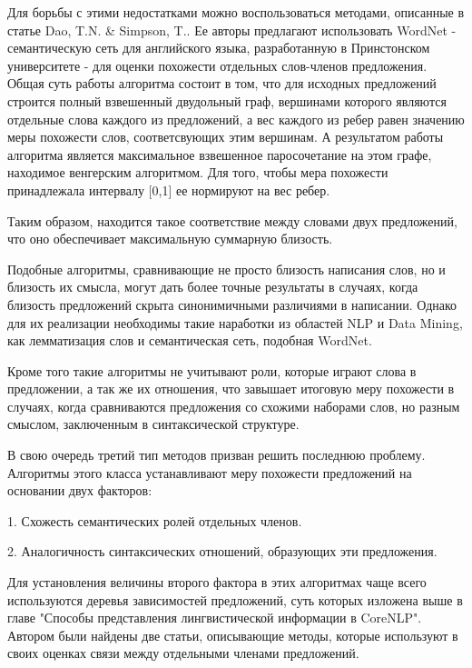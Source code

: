 Для борьбы с этими недостатками можно воспользоваться методами, описанные в статье Dao, T.N. & Simpson, T.\cite{wordnetSim}.
Ее авторы предлагают использовать WordNet\cite{wordnet} - семантическую сеть для английского языка, 
разработанную в Принстонском университете - для оценки похожести отдельных слов-членов предложения.
Общая суть работы алгоритма состоит в том, что для исходных предложений
строится полный взвешенный двудольный граф, вершинами которого являются отдельные
слова каждого из предложений, а вес каждого из ребер равен значению меры похожести слов,
соответсвующих этим вершинам. А результатом работы алгоритма является максимальное
взвешенное паросочетание на этом графе, находимое венгерским алгоритмом.
Для того, чтобы мера похожести принадлежала интервалу [0,1] ее нормируют на вес ребер.

Таким образом, находится такое соответствие между словами двух предложений,
что оно обеспечивает максимальную суммарную близость.

Подобные алгоритмы, сравнивающие не просто близость написания слов, 
но и близость их смысла, могут дать более точные результаты в случаях, 
когда близость предложений скрыта синонимичными различиями в написании.
Однако для их реализации необходимы такие наработки из областей NLP и Data Mining, 
как лемматизация слов и семантическая сеть, подобная WordNet\cite{wordnet}.


Кроме того такие алгоритмы не учитывают роли, которые играют слова в предложении,
а так же их отношения, что завышает итоговую меру похожести в случаях,
когда сравниваются предложения со схожими наборами слов, но разным смыслом,
заключенным в синтаксической структуре.

В свою очередь третий тип методов призван решить последнюю проблему. 
Алгоритмы этого класса устанавливают меру похожести предложений на основании двух факторов:

1. Схожесть семантических ролей отдельных членов.

2. Аналогичность синтаксических отношений, образующих эти предложения.

Для установления величины второго фактора в этих алгоритмах чаще всего используются
деревья зависимостей предложений, суть которых изложена выше в главе "Способы представления лингвистической информации в CoreNLP".
Автором были найдены две статьи, описывающие методы, 
которые используют в своих оценках связи между отдельными членами предложений.

